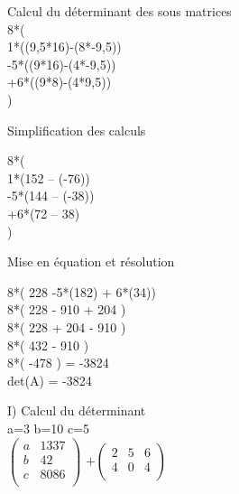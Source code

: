 \vspace{10mm} %
Calcul du déterminant des sous matrices \\

8*(\\

1*((9,5*16)-(8*-9,5))\\

-5*((9*16)-(4*-9,5))\\

+6*((9*8)-(4*9,5))\\

)

\vspace{10mm} %
Simplification des calculs
\vspace{5mm} %

8*(\\

  1*(152 – (-76))\\

  -5*(144 – (-38))\\

  +6*(72 – 38)\\

)

\vspace{20mm} %
Mise en équation et résolution
\vspace{5mm} %

8*( 228 -5*(182) + 6*(34)) \\

8*( 228 - 910 + 204 ) \\

8*( 228 + 204 - 910 ) \\

8*( 432 - 910 ) \\

8*( -478 ) = -3824 \\

det(A) = -3824 \\

\newpage

I) Calcul du déterminant \\

a=3 b=10 c=5 \\

$
\begin{pmatrix}
  a & 1337 \\
  b & 42 \\
  c & 8086 \\
\end{pmatrix}
$
\vspace{5mm} %
$
+
\begin{pmatrix}
  2 & 5 & 6 \\
  4 & 0 & 4 \\
\end{pmatrix}
$
\vspace{5mm} %

